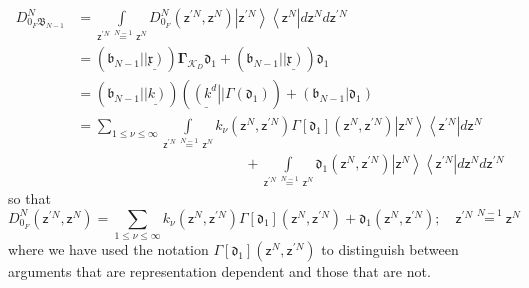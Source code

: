 \documentclass[aps,preprint]{revtex4}%
\begin{document}
\begin{align}
D_{0_{F}\mathfrak{B}_{N-1}}^{N}  &  =%
{\displaystyle\int\limits_{\mathsf{z}^{\prime N}\,\overset{N-1}{=}%
\,\mathsf{z}^{N}}}
D_{0_{F}}^{N}\left(  \mathsf{z}^{\prime N},\mathsf{z}^{N}\right)  \left\vert
\mathsf{z}^{\prime N}\right\rangle \left\langle \mathsf{z}^{N}\right\vert
d\mathsf{z}^{N}d\mathsf{z}^{\prime N}\nonumber\\
&  =\left(  \mathfrak{b}_{N-1}|\underline{\left\vert \mathfrak{x}\right)
}\right)  \mathbf{\Gamma}_{\mathcal{K}_{D}}\mathfrak{d}_{1}+\left(
\mathfrak{b}_{N-1}|\underline{\left\vert \mathfrak{x}\right)  }\right)
\mathfrak{d}_{1}\nonumber\\
&  =\left(  \mathfrak{b}_{N-1}|\underline{\left\vert k\right)  }\right)
\left(  \underline{\left(  k^{d}\right\vert }|\Gamma\left(  \mathfrak{d}%
_{1}\right)  \right)  +\left(  \mathfrak{b}_{N-1}|\mathfrak{d}_{1}\right)
\nonumber\\
&  =%
{\displaystyle\sum\limits_{1\leq\nu\leq\infty}}
{\displaystyle\int\limits_{\mathsf{z}^{\prime N}\,\overset{N-1}{=}%
\,\mathsf{z}^{N}}}
k_{\nu}\left(  \mathsf{z}^{N},\mathsf{z}^{\prime N}\right)  \Gamma\left[
\mathfrak{d}_{1}\right]  \left(  \mathsf{z}^{N},\mathsf{z}^{\prime N}\right)
\left\vert \mathsf{z}^{N}\right\rangle \left\langle \mathsf{z}^{\prime
N}\right\vert d\mathsf{z}^{N}\nonumber\\
&  \qquad\qquad\qquad\qquad\qquad\qquad+%
{\displaystyle\int\limits_{\mathsf{z}^{\prime N}\,\overset{N-1}{=}%
\,\mathsf{z}^{N}}}
\mathfrak{d}_{1}\left(  \mathsf{z}^{N},\mathsf{z}^{\prime N}\right)
\left\vert \mathsf{z}^{N}\right\rangle \left\langle \mathsf{z}^{\prime
N}\right\vert d\mathsf{z}^{N}d\mathsf{z}^{\prime N}%
\end{align}
so that
\begin{equation}
D_{0_{F}}^{N}\left(  \mathsf{z}^{\prime N},\mathsf{z}^{N}\right)  =%
{\displaystyle\sum\limits_{1\leq\nu\leq\infty}}
k_{\nu}\left(  \mathsf{z}^{N},\mathsf{z}^{\prime N}\right)  \Gamma\left[
\mathfrak{d}_{1}\right]  \left(  \mathsf{z}^{N},\mathsf{z}^{\prime N}\right)
+\mathfrak{d}_{1}\left(  \mathsf{z}^{N},\mathsf{z}^{\prime N}\right)
;\quad\mathsf{z}^{\prime N}\overset{N-1}{=}\mathsf{z}^{N}%
\end{equation}
where we have used the notation $\Gamma\left[  \mathfrak{d}_{1}\right]
\left(  \mathsf{z}^{N},\mathsf{z}^{\prime N}\right)  $ to distinguish between
arguments that are representation dependent and those that are not.
\end{document}

